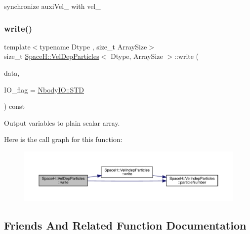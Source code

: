 synchronize auxi\+Vel\+\_\+ with vel\+\_\+ 

\mbox{\label{class_space_h_1_1_vel_dep_particles_acc81391b5d6d8344769eaee9b2b5096c}} 
\subsubsection{\texorpdfstring{write()}{write()}}
{\footnotesize\ttfamily template$<$typename Dtype , size\+\_\+t Array\+Size$>$ \\
size\+\_\+t \mbox{\hyperlink{class_space_h_1_1_vel_dep_particles}{Space\+H\+::\+Vel\+Dep\+Particles}}$<$ Dtype, Array\+Size $>$\+::write (\begin{DoxyParamCaption}\item[{\mbox{\hyperlink{class_space_h_1_1_vel_indep_particles_abca40159a816385790d5a6fd19c1dc6d}{Scalar\+Buffer}} \&}]{data,  }\item[{const \mbox{\hyperlink{namespace_space_h_a296a8bae763a754564bfdce216e31b59}{Nbody\+IO}}}]{I\+O\+\_\+flag = {\ttfamily \mbox{\hyperlink{namespace_space_h_a296a8bae763a754564bfdce216e31b59ac6ce23be5d350ce18a665427d2d950f7}{Nbody\+I\+O\+::\+S\+TD}}} }\end{DoxyParamCaption}) const\hspace{0.3cm}{\ttfamily [inline]}}



Output variables to plain scalar array. 

Here is the call graph for this function\+:
\nopagebreak
\begin{figure}[H]
\begin{center}
\leavevmode
\includegraphics[width=350pt]{class_space_h_1_1_vel_dep_particles_acc81391b5d6d8344769eaee9b2b5096c_cgraph}
\end{center}
\end{figure}


\subsection{Friends And Related Function Documentation}
\mbox{\label{class_space_h_1_1_vel_dep_particles_a1c8e1f97848175d472220a784c186c6a}} 
